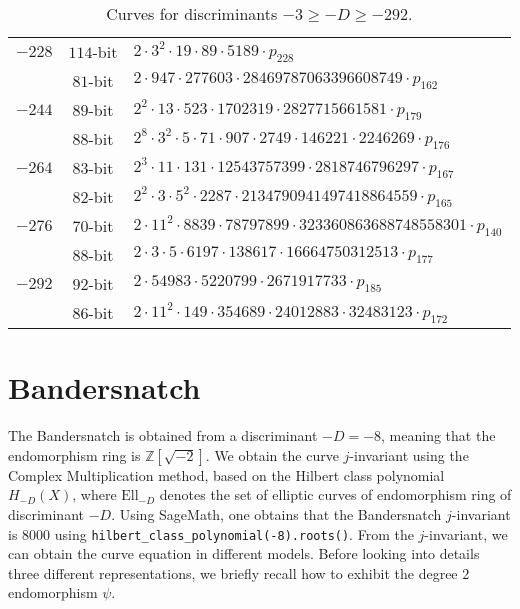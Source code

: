 \documentclass{article}
\newcommand{\Z}{\ensuremath{\mathbb Z}}
\theoremstyle{definition}
\begin{document}
\begin{table*}[!ht]
\begin{tabularx}{\textwidth}{ccl}
$-228$ & $114$-bit & $2  \cdot 3^{2}  \cdot 19  \cdot 89  \cdot 5189  \cdot p_{228}$\\
 & $81$-bit & $2  \cdot 947  \cdot 277603  \cdot 28469787063396608749  \cdot p_{162}$\\
$-244$ & $89$-bit & $2^{2}  \cdot 13  \cdot 523  \cdot 1702319  \cdot 2827715661581  \cdot p_{179}$\\
 & $88$-bit & $2^{8}  \cdot 3^{2}  \cdot 5  \cdot 71  \cdot 907  \cdot 2749  \cdot 146221  \cdot 2246269  \cdot p_{176}$\\
$-264$ & $83$-bit & $2^{3}  \cdot 11  \cdot 131  \cdot 12543757399  \cdot 2818746796297  \cdot p_{167}$\\
 & $82$-bit & $2^{2}  \cdot 3  \cdot 5^{2}  \cdot 2287  \cdot 2134790941497418864559  \cdot p_{165}$\\
$-276$ & $70$-bit & $2  \cdot 11^{2}  \cdot 8839  \cdot 78797899  \cdot 323360863688748558301  \cdot p_{140}$\\
 & $88$-bit & $2  \cdot 3  \cdot 5  \cdot 6197  \cdot 138617  \cdot 16664750312513  \cdot p_{177}$\\
$-292$ & $92$-bit & $2  \cdot 54983  \cdot 5220799  \cdot 2671917733  \cdot p_{185}$\\
 & $86$-bit & $2  \cdot 11^{2}  \cdot 149  \cdot 354689  \cdot
24012883  \cdot 32483123  \cdot p_{172}$\\
\bottomrule
    \end{tabularx}
    \caption{Curves for discriminants $-3 \geq -D \geq -292$.}
    \label{tab:group-order-factorization}
\end{table*}

\section{Bandersnatch}\label{sec:bandersnatch}

The Bandersnatch is obtained from a discriminant $-D = -8$, meaning
that the endomorphism ring is $\Z[\sqrt{-2}]$.
We obtain the curve $j$-invariant using the Complex Multiplication
method, based on the Hilbert class polynomial $H_{-D}(X)$, where
$\text{Ell}_{-D}$ denotes the set of elliptic curves of endomorphism
ring of discriminant $-D$.
Using SageMath, one obtains that the Bandersnatch $j$-invariant is
$8000$ using \texttt{hilbert\_class\_polynomial(-8).roots()}.
From the $j$-invariant, we can obtain the curve equation in different
models. Before looking into details three different representations,
we briefly recall how to exhibit the degree $2$ endomorphism $\psi$.
\end{document}
